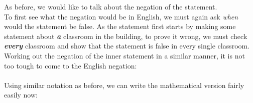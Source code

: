 As before, we would like to talk about the negation of the statement.\\
To first see what the negation would be in English, we must again ask \textit{when} would the statement be false. As the statement first starts by making some statement about \textit{\textbf{a}} classroom in the building, to prove it wrong, we must check \textbf{\textit{every}} classroom and show that the statement is false in every single classroom. Working out the negation of the inner statement in a similar manner, it is not too tough to come to the English negation:\\
\\
Using similar notation as before, we can write the mathematical version fairly easily now:\\

\hrulefill
{}

